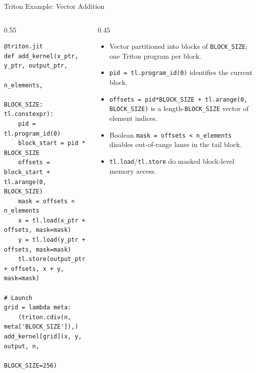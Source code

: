 \begin{frame}[fragile]{Triton Example: Vector Addition}
\begin{columns}[T]
  \begin{column}{0.55\textwidth}
\begin{lstlisting}[basicstyle=\ttfamily\scriptsize]
@triton.jit
def add_kernel(x_ptr, y_ptr, output_ptr,
               n_elements,
               BLOCK_SIZE: tl.constexpr):
    pid = tl.program_id(0)
    block_start = pid * BLOCK_SIZE
    offsets = block_start + tl.arange(0, BLOCK_SIZE)
    mask = offsets < n_elements
    x = tl.load(x_ptr + offsets, mask=mask)
    y = tl.load(y_ptr + offsets, mask=mask)
    tl.store(output_ptr + offsets, x + y, mask=mask)

# Launch
grid = lambda meta:
    (triton.cdiv(n, meta['BLOCK_SIZE']),)
add_kernel[grid](x, y, output, n,
                 BLOCK_SIZE=256)
\end{lstlisting}
  \end{column}
  \begin{column}{0.45\textwidth}
    \centering

    \vspace{0.6em}
    {\scriptsize
    \begin{itemize}\itemsep0.2em
      \item Vector partitioned into blocks of \texttt{BLOCK\_SIZE}; one Triton program per block.
      \item \texttt{pid = tl.program\_id(0)} identifies the current block.
      \item \texttt{offsets = pid*BLOCK\_SIZE + tl.arange(0, BLOCK\_SIZE)} is a length-\texttt{BLOCK\_SIZE} vector of element indices.
      \item Boolean \texttt{mask = offsets < n\_elements} disables out-of-range lanes in the tail block.
      \item \texttt{tl.load}/\texttt{tl.store} do masked block-level memory access.
    \end{itemize}
    }
  \end{column}
\end{columns}
\end{frame}

